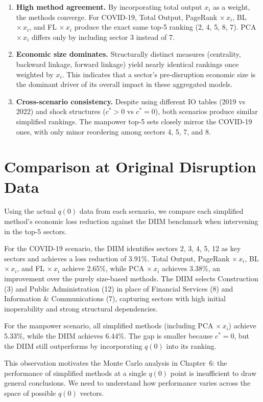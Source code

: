\begin{enumerate}
    \item \textbf{High method agreement.} By incorporating total output $x_i$ as a weight, the methods converge. For COVID-19, Total Output, PageRank $\times\, x_i$, BL $\times\, x_i$, and FL $\times\, x_i$ produce the exact same top-5 ranking (2, 4, 5, 8, 7). PCA $\times\, x_i$ differs only by including sector 3 instead of 7.
    \item \textbf{Economic size dominates.} Structurally distinct measures (centrality, backward linkage, forward linkage) yield nearly identical rankings once weighted by $x_i$. This indicates that a sector's pre-disruption economic size is the dominant driver of its overall impact in these aggregated models.
    \item \textbf{Cross-scenario consistency.} Despite using different IO tables (2019 vs 2022) and shock structures ($c^* > 0$ vs $c^* = 0$), both scenarios produce similar simplified rankings. The manpower top-5 sets closely mirror the COVID-19 ones, with only minor reordering among sectors 4, 5, 7, and 8.
\end{enumerate}


\section{Comparison at Original Disruption Data}

Using the actual $q(0)$ data from each scenario, we compare each simplified method's economic loss reduction against the DIIM benchmark when intervening in the top-5 sectors.

For the COVID-19 scenario, the DIIM identifies sectors 2, 3, 4, 5, 12 as key sectors and achieves a loss reduction of 3.91\%. Total Output, PageRank $\times\, x_i$, BL $\times\, x_i$, and FL $\times\, x_i$ achieve 2.65\%, while PCA $\times\, x_i$ achieves 3.38\%, an improvement over the purely size-based methods. The DIIM selects Construction (3) and Public Administration (12) in place of Financial Services (8) and Information \& Communications (7), capturing sectors with high initial inoperability and strong structural dependencies.

For the manpower scenario, all simplified methods (including PCA $\times\, x_i$) achieve 5.33\%, while the DIIM achieves 6.44\%. The gap is smaller because $c^* = 0$, but the DIIM still outperforms by incorporating $q(0)$ into its ranking.

This observation motivates the Monte Carlo analysis in Chapter~6: the performance of simplified methods at a single $q(0)$ point is insufficient to draw general conclusions. We need to understand how performance varies across the space of possible $q(0)$ vectors.


